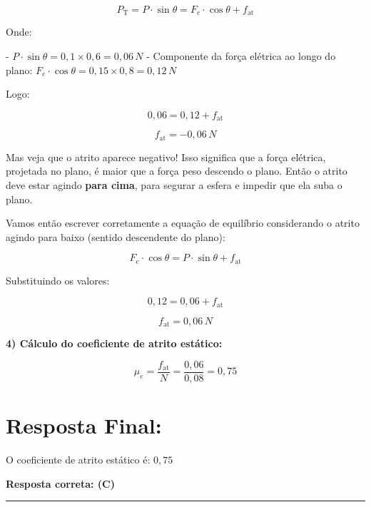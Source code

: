 \documentclass[a4paper,12pt]{article}
\begin{document}
\begin{flushleft}
\[
P_{\text{T}} = P \cdot \sin\theta = F_e \cdot \cos\theta + f_{\text{at}}
\]

Onde:

- $P \cdot \sin\theta = 0{,}1 \times 0{,}6 = 0{,}06\,N$
- Componente da força elétrica ao longo do plano: $F_e \cdot \cos\theta = 0{,}15 \times 0{,}8 = 0{,}12\,N$

Logo:

\[
0{,}06 = 0{,}12 + f_{\text{at}}
\]

\[
f_{\text{at}} = -0{,}06\,N
\]

Mas veja que o atrito aparece negativo! Isso significa que a força elétrica, projetada no plano, é maior que a força peso descendo o plano. Então o atrito deve estar agindo \textbf{para cima}, para segurar a esfera e impedir que ela suba o plano.

Vamos então escrever corretamente a equação de equilíbrio considerando o atrito agindo para baixo (sentido descendente do plano):

\[
F_e \cdot \cos\theta = P \cdot \sin\theta + f_{\text{at}}
\]

Substituindo os valores:

\[
0{,}12 = 0{,}06 + f_{\text{at}}
\]

\[
f_{\text{at}} = 0{,}06\,N
\]

\textbf{4) Cálculo do coeficiente de atrito estático:}

\[
\mu_e = \frac{f_{\text{at}}}{N} = \frac{0{,}06}{0{,}08} = 0{,}75
\]

\section*{Resposta Final:}

O coeficiente de atrito estático é: $\boxed{0{,}75}$

\textbf{Resposta correta: \colorbox{green!50}{(C)}}

\end{flushleft}

\noindent\rule{\linewidth}{0.6pt}\\
\end{document}
